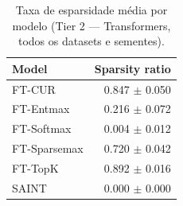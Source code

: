 \begin{table}[ht]
  \centering
  \caption{Taxa de esparsidade média por modelo (Tier 2 — Transformers, todos os datasets e sementes).}
  \label{tab:tier2_transformers_sparsity}
  \begin{tabular}{lr}
    \toprule
    Model & Sparsity ratio \\
    \midrule
FT-CUR & 0.847 $\pm$ 0.050 \\
FT-Entmax & 0.216 $\pm$ 0.072 \\
FT-Softmax & 0.004 $\pm$ 0.012 \\
FT-Sparsemax & 0.720 $\pm$ 0.042 \\
FT-TopK & 0.892 $\pm$ 0.016 \\
SAINT & 0.000 $\pm$ 0.000 \\
    \bottomrule
  \end{tabular}
\end{table}